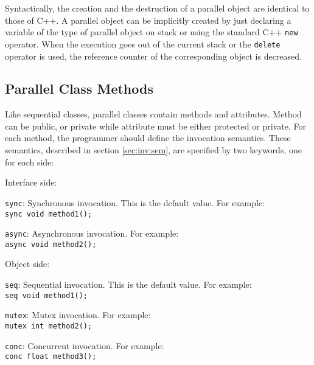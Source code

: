 Syntactically, the creation and the destruction of a parallel object are
identical to those of C++. A parallel object can be implicitly created
by just declaring a variable of the type of parallel object on stack or
using the standard C++ \texttt{new} operator. When the execution goes
out of the current stack or the \texttt{delete} operator is used, the
reference counter of the corresponding object is decreased.


\subsection{Parallel Class Methods}

Like sequential classes, parallel classes contain methods and attributes.
Method can be public, or private while attribute must be either protected
or private. For each method, the programmer should define the invocation
semantics. These semantics, described in section \ref{sec:inv:sem}, are
specified by two keywords, one for each side:

\begin{petitem}

\item Interface side:

	\begin{petitem}

	\item \texttt{sync}: Synchronous invocation. This is the
		default value. For example: \\
		\texttt{sync void method1();}

	\item \texttt{async}: Asynchronous invocation. For example:\\
		\texttt{async void method2();}

	\end{petitem}

\item Object side:

	\begin{petitem}

	\item \texttt{seq}: Sequential invocation. This is the default
		value. For example:\\
		\texttt{seq void method1();}

	\item \texttt{mutex}: Mutex invocation. For example:\\
		\texttt{mutex int method2();}

	\item \texttt{conc}: Concurrent invocation. For example:\\
		\texttt{conc float method3();}

	\end{petitem}

\end{petitem}

